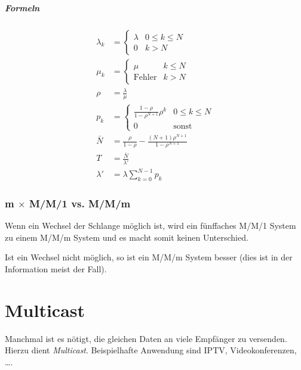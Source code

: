\documentclass[a4paper, 11pt, accentcolor = tud3b]{tudreport}
\begin{document}
				\paragraph{Formeln}
					\begin{align*}
						\lambda _ k & = \begin{cases}
							\lambda & 0 \leq k \leq N \\
							0       & k > N
						\end{cases} \\
						\mu _ k     & = \begin{cases}
							\mu & k \leq N \\
							\text{Fehler} & k > N
						\end{cases} \\
						\rho        & = \frac{\lambda}{\mu} \\
						p _ k       & = \begin{cases}
							\frac{1 - \rho}{1 - \rho ^ {N + 1}} \rho ^ k & 0 \leq k \leq N \\
							0 & \text{sonst}
						\end{cases} \\
						\bar{N}     & = \frac{\rho}{1 - \rho} - \frac{(N + 1) \rho ^ { N + 1 }}{1 - \rho ^ { N + 1 }} \\
						T           & = \frac{\bar{N}}{\lambda'} \\
						\lambda'    & = \lambda \sum _ { k = 0 } ^ { N - 1 } p _ k
					\end{align*}
			
			\subsection{m \(\times\) M/M/1 vs. M/M/m} %
				Wenn ein Wechsel der Schlange möglich ist, wird ein fünffaches M/M/1 System zu einem M/M/m System und es macht somit keinen Unterschied.
				
				Ist ein Wechsel nicht möglich, so ist ein M/M/m System besser (dies ist in der Information meist der Fall).

    \chapter{Multicast}
        Manchmal ist es nötigt, die gleichen Daten an viele Empfänger zu versenden. Hierzu dient \textit{Multicast}. Beispielhafte Anwendung sind IPTV, Videokonferenzen, \dots.
        
\end{document}
